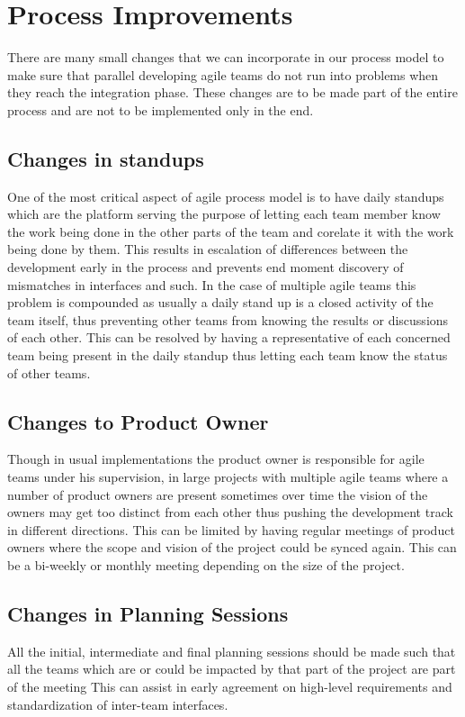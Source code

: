 \section{Process Improvements} 
\label{sec:proc_impv}
	There are many small changes that we can incorporate in our process model to make sure that parallel developing agile teams do not run into problems when they reach the integration phase. These changes are to be made part of the entire process and are not to be implemented only in the end.

\subsection{Changes in standups}
	One of the most critical aspect of agile process model is to have daily standups which are the platform serving the purpose of letting each team member know the work being done in the other parts of the team and corelate it with the work being done by them. This results in escalation of differences between the development early in the process and prevents end moment discovery of mismatches in interfaces and such. In the case of multiple agile teams this problem is compounded as usually a daily stand up is a closed activity of the team itself, thus preventing other teams from knowing the results or discussions of each other. This can be resolved by having a representative of each concerned team being present in the daily standup thus letting each team know the status of other teams.

\subsection{Changes to Product Owner}
	Though in usual implementations the product owner is responsible for agile teams under his supervision, in large projects with multiple agile teams where a number of product owners are present sometimes over time the vision of the owners may get too distinct from each other thus pushing the development track in different directions. This can be limited by having regular meetings of product owners where the scope and vision of the project could be synced again. This can be a bi-weekly or monthly meeting depending on the size of the project.

\subsection{Changes in Planning Sessions}
	All the initial, intermediate and final planning sessions should be made such that all the teams which are or could be impacted by that part of the project are part of the meeting This can assist in early agreement on high-level requirements and standardization of inter-team interfaces.


